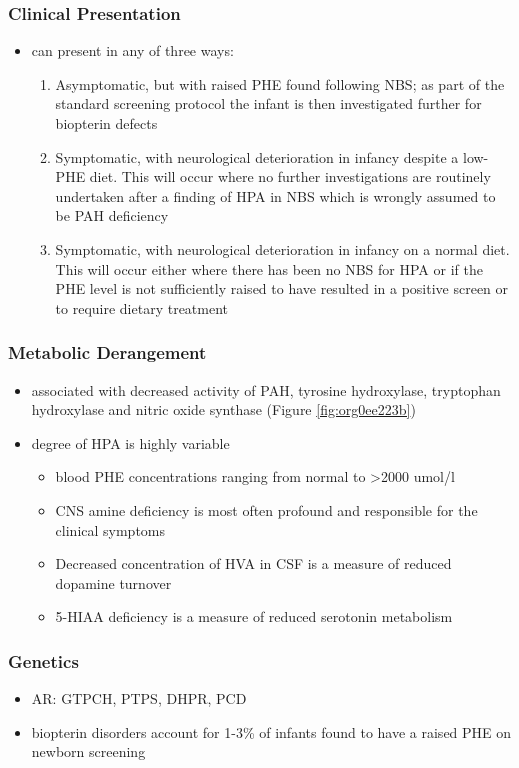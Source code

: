 \documentclass{scrartcl}
\begin{document}
\subsubsection{Clinical Presentation}
\label{sec:org418ca9b}
\begin{itemize}
\item can present in any of three ways:
\begin{enumerate}
\item Asymptomatic, but with raised PHE found following NBS; as part of
the standard screening protocol the infant is then investigated
further for biopterin defects
\item Symptomatic, with neurological deterioration in infancy despite a
low-PHE diet. This will occur where no further investigations are
routinely undertaken after a finding of HPA in NBS which is
wrongly assumed to be PAH deficiency
\item Symptomatic, with neurological deterioration in infancy on a
normal diet. This will occur either where there has been no NBS
for HPA or if the PHE level is not sufficiently raised to have
resulted in a positive screen or to require dietary treatment
\end{enumerate}
\end{itemize}
\subsubsection{Metabolic Derangement}
\label{sec:orga56d886}
\begin{itemize}
\item associated with decreased activity of PAH, tyrosine hydroxylase,
tryptophan hydroxylase and nitric oxide synthase (Figure \ref{fig:org0ee223b})
\item degree of HPA is highly variable
\begin{itemize}
\item blood PHE concentrations ranging from normal to \textgreater{}2000 umol/l
\item CNS amine deficiency is most often profound and responsible for
the clinical symptoms
\item Decreased concentration of HVA in CSF is a measure of reduced
dopamine turnover
\item 5-HIAA deficiency is a measure of reduced serotonin metabolism
\end{itemize}
\end{itemize}

\subsubsection{Genetics}
\label{sec:org0a39151}
\begin{itemize}
\item AR: GTPCH, PTPS, DHPR, PCD
\item biopterin disorders account for 1-3\% of infants found to have a
raised PHE on newborn screening
\end{itemize}
\end{document}
